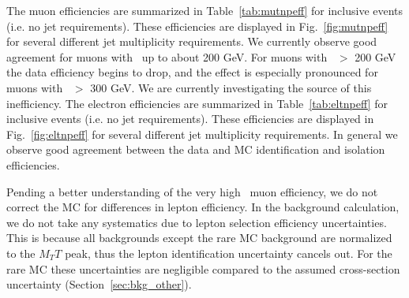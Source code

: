 The muon efficiencies are summarized in Table~\ref{tab:mutnpeff} for inclusive events (i.e. no jet requirements). These efficiencies are displayed in Fig.~\ref{fig:mutnpeff} for
several different jet multiplicity requirements. We currently observe good agreement for muons with \pt\ up to about 200 GeV. For muons with \pt\ $>$ 200 GeV the data efficiency
begins to drop, and the effect is especially pronounced for muons with \pt\ $>$ 300 GeV. We are currently investigating the source of this inefficiency.
The electron efficiencies are summarized in Table~\ref{tab:eltnpeff} for inclusive events (i.e. no jet requirements). These efficiencies are displayed in Fig.~\ref{fig:eltnpeff} for several different jet multiplicity requirements. In general we observe good agreement between the data and MC identification and isolation efficiencies.

Pending a better understanding of the very high \pt\ muon efficiency,  we
do not correct the MC for differences in lepton efficiency.  In the
background calculation, we do not take any systematics due to lepton
selection
efficiency uncertainties.  This is because all backgrounds except the 
rare MC background are normalized to the $M_TT$ peak, thus the lepton
identification uncertainty cancels out.  For the rare MC these
uncertainties
are negligible compared to the assumed cross-section uncertainty
(Section~\ref{sec:bkg_other}).




